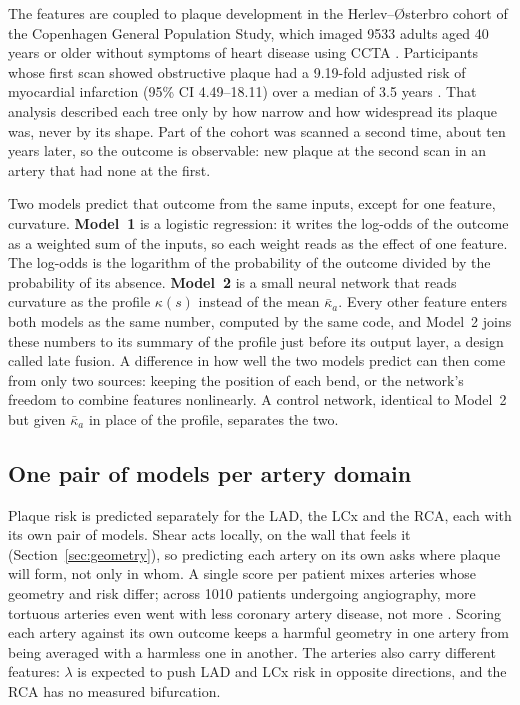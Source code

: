 The features are coupled to plaque development in the Herlev--{\O}sterbro cohort of the Copenhagen General Population Study, which imaged 9533 adults aged 40 years or older without symptoms of heart disease using CCTA \cite{fuchs2023cgps}.
Participants whose first scan showed obstructive plaque had a 9.19-fold adjusted risk of myocardial infarction (95\% CI 4.49--18.11) over a median of 3.5 years \cite{fuchs2023cgps}.
That analysis described each tree only by how narrow and how widespread its plaque was, never by its shape.
Part of the cohort was scanned a second time, about ten years later, so the outcome is observable: new plaque at the second scan in an artery that had none at the first.

Two models predict that outcome from the same inputs, except for one feature, curvature.
\textbf{Model~1} is a logistic regression: it writes the log-odds of the outcome as a weighted sum of the inputs, so each weight reads as the effect of one feature.
The log-odds is the logarithm of the probability of the outcome divided by the probability of its absence.
\textbf{Model~2} is a small neural network that reads curvature as the profile $\kappa(s)$ instead of the mean $\bar\kappa_a$.
Every other feature enters both models as the same number, computed by the same code, and Model~2 joins these numbers to its summary of the profile just before its output layer, a design called late fusion.
A difference in how well the two models predict can then come from only two sources: keeping the position of each bend, or the network's freedom to combine features nonlinearly.
A control network, identical to Model~2 but given $\bar\kappa_a$ in place of the profile, separates the two.

\subsection{One pair of models per artery domain}
\label{sec:risk-domains}

Plaque risk is predicted separately for the LAD, the LCx and the RCA, each with its own pair of models.
Shear acts locally, on the wall that feels it (Section~\ref{sec:geometry}), so predicting each artery on its own asks where plaque will form, not only in whom.
A single score per patient mixes arteries whose geometry and risk differ; across 1010 patients undergoing angiography, more tortuous arteries even went with less coronary artery disease, not more \cite{li2011tortuosity}.
Scoring each artery against its own outcome keeps a harmful geometry in one artery from being averaged with a harmless one in another.
The arteries also carry different features: $\lambda$ is expected to push LAD and LCx risk in opposite directions, and the RCA has no measured bifurcation.

